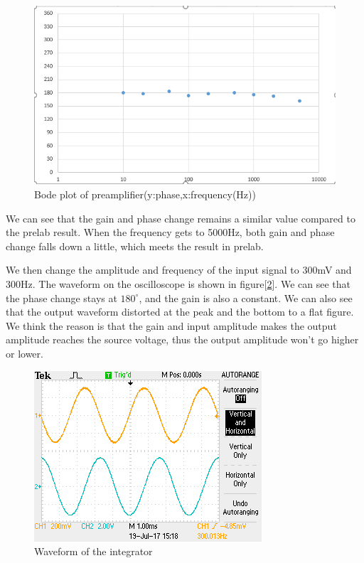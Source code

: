 \begin{figure}[!htbp]
	\centering 
	\begin{framed}
		\includegraphics[width=\linewidth]{images/1_2.PNG} 
		\caption{Bode plot of preamplifier(y:phase,x:frequency(Hz))}
		\label{fig:102} 
	\end{framed}
\end{figure}

\phantom{ } We can see that the gain and phase change remains a similar value compared to the prelab result. When the frequency gets to 5000Hz, both gain and phase change falls down a little, which meets the result in prelab.

\phantom{ } We then change the amplitude and frequency of the input signal to 300mV and 300Hz. The waveform on the oscilloscope is shown in figure[\ref{fig:103}]. We can see that the phase change stays at $ 180^{\circ} $, and the gain is also a constant. We can also see that the output waveform distorted at the peak and the bottom to a flat figure. We think the reason is that the gain and input amplitude makes the output amplitude reaches the source voltage, thus the output amplitude won't go higher or lower.\\
\begin{figure}[!htbp]
	\centering 
	\begin{framed}
		\includegraphics[width=\linewidth]{images/osc1.png}
		\caption{Waveform of the integrator}
		\label{fig:103} 
	\end{framed}
\end{figure} 

